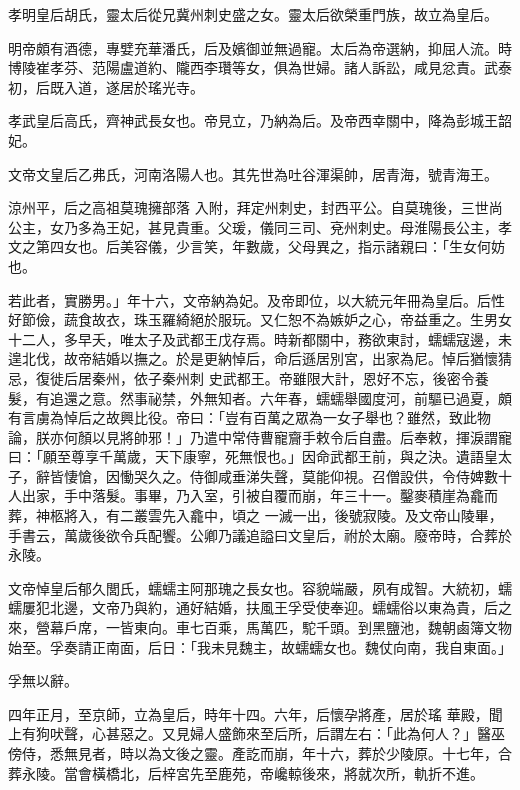 \begin{pinyinscope}
 孝明皇后胡氏，靈太后從兄冀州刺史盛之女。靈太后欲榮重門族，故立為皇后。



 明帝頗有酒德，專嬖充華潘氏，后及嬪御並無過寵。太后為帝選納，抑屈人流。時博陵崔孝芬、范陽盧道約、隴西李瓚等女，俱為世婦。諸人訴訟，咸見忿責。武泰初，后既入道，遂居於瑤光寺。



 孝武皇后高氏，齊神武長女也。帝見立，乃納為后。及帝西幸關中，降為彭城王韶妃。



 文帝文皇后乙弗氏，河南洛陽人也。其先世為吐谷渾渠帥，居青海，號青海王。



 涼州平，后之高祖莫瑰擁部落
 入附，拜定州刺史，封西平公。自莫瑰後，三世尚公主，女乃多為王妃，甚見貴重。父瑗，儀同三司、兗州刺史。母淮陽長公主，孝文之第四女也。后美容儀，少言笑，年數歲，父母異之，指示諸親曰：「生女何妨也。



 若此者，實勝男。」年十六，文帝納為妃。及帝即位，以大統元年冊為皇后。后性好節儉，蔬食故衣，珠玉羅綺絕於服玩。又仁恕不為嫉妒之心，帝益重之。生男女十二人，多早夭，唯太子及武都王戊存焉。時新都關中，務欲東討，蠕蠕寇邊，未遑北伐，故帝結婚以撫之。於是更納悼后，命后遜居別宮，出家為尼。悼后猶懷猜忌，復徙后居秦州，依子秦州刺
 史武都王。帝雖限大計，恩好不忘，後密令養髮，有追還之意。然事祕禁，外無知者。六年春，蠕蠕舉國度河，前驅已過夏，頗有言虜為悼后之故興比役。帝曰：「豈有百萬之眾為一女子舉也？雖然，致此物論，朕亦何顏以見將帥邪！」乃遣中常侍曹寵齎手敕令后自盡。后奉敕，揮淚謂寵曰：「願至尊享千萬歲，天下康寧，死無恨也。」因命武都王前，與之決。遺語皇太子，辭皆悽愴，因慟哭久之。侍御咸垂涕失聲，莫能仰視。召僧設供，令侍婢數十人出家，手中落髮。事畢，乃入室，引被自覆而崩，年三十一。鑿麥積崖為龕而葬，神柩將入，有二叢雲先入龕中，頃之
 一滅一出，後號寂陵。及文帝山陵畢，手書云，萬歲後欲令兵配饗。公卿乃議追謚曰文皇后，祔於太廟。廢帝時，合葬於永陵。



 文帝悼皇后郁久閭氏，蠕蠕主阿那瑰之長女也。容貌端嚴，夙有成智。大統初，蠕蠕屢犯北邊，文帝乃與約，通好結婚，扶風王孚受使奉迎。蠕蠕俗以東為貴，后之來，營幕戶席，一皆東向。車七百乘，馬萬匹，駝千頭。到黑鹽池，魏朝鹵簿文物始至。孚奏請正南面，后日：「我未見魏主，故蠕蠕女也。魏仗向南，我自東面。」



 孚無以辭。



 四年正月，至京師，立為皇后，時年十四。六年，后懷孕將產，居於瑤
 華殿，聞上有狗吠聲，心甚惡之。又見婦人盛飾來至后所，后謂左右：「此為何人？」醫巫傍侍，悉無見者，時以為文後之靈。產訖而崩，年十六，葬於少陵原。十七年，合葬永陵。當會橫橋北，后梓宮先至鹿苑，帝巉輬後來，將就次所，軌折不進。




\end{pinyinscope}
